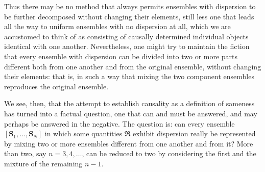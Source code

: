 \documentclass[fontsize=13pt,twoside,openany,headings=normal,parskip=false,bookmarkpackage=false,DIV=calc]{scrbook}
\begin{document}
Thus there may be no method that always permits ensembles with dispersion to be further decomposed without changing their elements, still less one that leads all the way to uniform ensembles with no dispersion at all, which we are accustomed to think of as consisting of causally determined individual objects identical with one another. Nevertheless, one might try to maintain the fiction that every ensemble with dispersion can be divided into two or more parts different both from one another and from the original ensemble, without changing their elements: that is, in such a way that mixing the two component ensembles reproduces the original ensemble.

We see, then, that the attempt to establish causality as a definition of sameness has turned into a factual question, one that can and must be answered, and may perhaps be answered in the negative. The question is: can every ensemble $[\boldsymbol{S}_1,\ldots,\boldsymbol{S}_N]$ in which some quantities $\mathfrak R$ exhibit dispersion really be represented by mixing two or more ensembles different from one another and from it? More than two, say $n=3,4,\ldots$, can be reduced to two by considering the first and the mixture of the remaining $n-1$.
\end{document}

